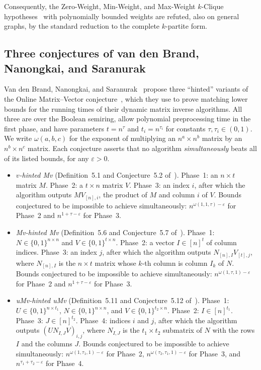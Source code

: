 Consequently, the Zero-Weight, Min-Weight, and Max-Weight $k$-Clique hypotheses~\cite{AL13,LVW18,BDT16} with polynomially bounded weights are refuted, also on general graphs, by the standard reduction to the complete $k$-partite form.

\subsection{Three conjectures of van den Brand, Nanongkai, and Saranurak}\label{sec:bns}

Van den Brand, Nanongkai, and Saranurak~\cite{BNS19} propose three ``hinted'' variants of the Online Matrix--Vector conjecture~\cite{HKNS15}, which they use to prove matching lower bounds for the running times of their dynamic matrix inverse algorithms. All three are over the Boolean semiring, allow polynomial preprocessing time in the first phase, and have parameters $t=n^{\tau}$ and $t_i=n^{\tau_i}$ for constants $\tau,\tau_i\in(0,1)$. We write $\omega(a,b,c)$ for the exponent of multiplying an $n^a\times n^b$ matrix by an $n^b\times n^c$ matrix. Each conjecture asserts that no algorithm {\em simultaneously} beats all of its listed bounds, for any $\varepsilon>0$.
\begin{itemize}
\item \emph{$v$-hinted Mv} (Definition~5.1 and Conjecture~5.2 of~\cite{BNS19}). Phase~1: an $n\times t$ matrix $M$. Phase~2: a $t\times n$ matrix $V$. Phase~3: an index $i$, after which the algorithm outputs $MV_{[n],i}$, the product of $M$ and column $i$ of $V$. Bounds conjectured to be impossible to achieve simultaneously: $n^{\omega(1,1,\tau)-\varepsilon}$ for Phase~2 and $n^{1+\tau-\varepsilon}$ for Phase~3.
\item \emph{Mv-hinted Mv} (Definition~5.6 and Conjecture~5.7  of~\cite{BNS19}). Phase~1: $N\in\{0,1\}^{n\times n}$ and $V\in\{0,1\}^{t\times n}$. Phase~2: a vector $I\in[n]^t$ of column indices. Phase~3: an index $j$, after which the algorithm outputs $N_{[n],I}V_{[t],j}$, where $N_{[n],I}$ is the $n\times t$ matrix whose $k$-th column is column $I_k$ of $N$. Bounds conjectured to be impossible to achieve simultaneously: $n^{\omega(1,\tau,1)-\varepsilon}$ for Phase~2 and $n^{1+\tau-\varepsilon}$ for Phase~3.
\item \emph{uMv-hinted uMv} (Definition~5.11 and Conjecture~5.12  of~\cite{BNS19}). Phase~1: $U\in\{0,1\}^{n\times t_1}$, $N\in\{0,1\}^{n\times n}$, and $V\in\{0,1\}^{t_2\times n}$. Phase~2: $I\in[n]^{t_1}$. Phase~3: $J\in[n]^{t_2}$. Phase~4: indices $i$ and $j$, after which the algorithm outputs $(UN_{I,J}V)_{i,j}$, where $N_{I,J}$ is the $t_1\times t_2$ submatrix of $N$ with the rows $I$ and the columns $J$. Bounds conjectured to be impossible to achieve simultaneously: $n^{\omega(1,\tau_1,1)-\varepsilon}$ for Phase~2, $n^{\omega(\tau_2,\tau_1,1)-\varepsilon}$ for Phase~3, and $n^{\tau_1+\tau_2-\varepsilon}$ for Phase~4.
\end{itemize}
